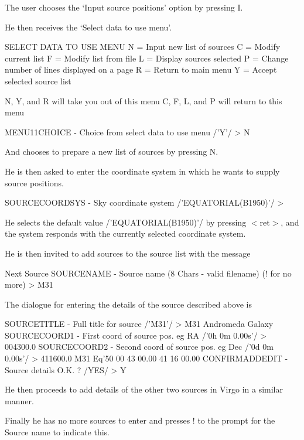 \documentclass[twoside,11pt]{starlink}
\begin{document}
The user chooses the `Input source positions' option by pressing I.

He then receives the `Select data to use menu'.

\begin{terminalv}
SELECT DATA TO USE MENU
  N = Input new list of sources
  C = Modify current list
  F = Modify list from file
  L = Display sources selected
  P = Change number of lines displayed on a page
  R = Return to main menu
  Y = Accept selected source list

N, Y, and R will take you out of this menu
C, F, L, and P will return to this menu

MENU11CHOICE - Choice from select data to use menu /'Y'/ > N
\end{terminalv}

And chooses to prepare a new list of sources by pressing N.

He is then asked to enter the coordinate system in which he wants to supply
source positions.

\begin{terminalv}
SOURCECOORDSYS - Sky coordinate system /'EQUATORIAL(B1950)'/ >
\end{terminalv}

He selects the default value /'EQUATORIAL(B1950)'/ by pressing $<$ret$>$,
and the system responds with the currently selected coordinate system.

He is then invited to add sources to the source list with the message

\begin{terminalv}
Next Source
SOURCENAME - Source name (8 Chars - valid filename) (! for no more) > M31
\end{terminalv}

The dialogue for entering the details of the source described above is

\begin{terminalv}
SOURCETITLE - Full title for source /'M31'/ > M31 Andromeda Galaxy
SOURCECOORD1 - First coord of source pos. eg RA /'0h 0m 0.00s'/ > 004300.0
SOURCECOORD2 - Second coord of source pos. eg Dec /'0d 0m 0.00s'/ > 411600.0
M31        Eq'50    00 43 00.00     41 16 00.00
CONFIRMADDEDIT - Source details O.K. ? /YES/ > Y
\end{terminalv}

He then proceeds to add details of the other two sources in Virgo in a similar
manner.

Finally he has no more sources to enter and presses ! to the prompt for the
Source name to indicate this.
\end{document}
